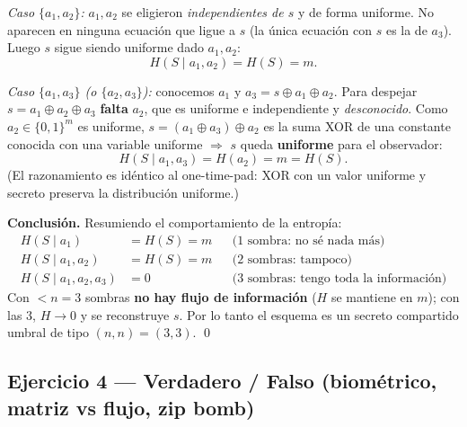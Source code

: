 \emph{Caso $\{a_1,a_2\}$:} $a_1,a_2$ se eligieron \emph{independientes de $s$} y de forma
uniforme. No aparecen en ninguna ecuación que ligue a $s$ (la única ecuación con $s$ es la de
$a_3$). Luego $s$ sigue siendo uniforme dado $a_1,a_2$:
\begin{equation*}
H(S \mid a_1, a_2) = H(S) = m .
\end{equation*}

\emph{Caso $\{a_1,a_3\}$ (o $\{a_2,a_3\}$):} conocemos $a_1$ y $a_3 = s\oplus a_1\oplus a_2$.
Para despejar $s = a_1\oplus a_2\oplus a_3$ \textbf{falta} $a_2$, que es uniforme e independiente y
\emph{desconocido}. Como $a_2\in\{0,1\}^m$ es uniforme, $s = (a_1\oplus a_3)\oplus a_2$ es la suma
XOR de una constante conocida con una variable uniforme $\Rightarrow$ $s$ queda \textbf{uniforme}
para el observador:
\begin{equation*}
H(S \mid a_1, a_3) = H(a_2) = m = H(S) .
\end{equation*}
(El razonamiento es idéntico al one-time-pad: XOR con un valor uniforme y secreto preserva la
distribución uniforme.)

\smallskip
\noindent\textbf{Conclusión.} Resumiendo el comportamiento de la entropía:
\begin{align*}
H(S \mid a_1)            &= H(S) = m && \text{(1 sombra: no sé nada más)}\\
H(S \mid a_1, a_2)       &= H(S) = m && \text{(2 sombras: tampoco)}\\
H(S \mid a_1, a_2, a_3)  &= 0        && \text{(3 sombras: tengo toda la información)}
\end{align*}
Con $<n=3$ sombras \textbf{no hay flujo de información} ($H$ se mantiene en $m$); con las $3$,
$H\to 0$ y se reconstruye $s$. Por lo tanto el esquema es un secreto compartido umbral de tipo
$(n,n)=(3,3)$. \qed

\subsection{Ejercicio 4 — Verdadero / Falso (biométrico, matriz vs flujo, zip bomb)}

